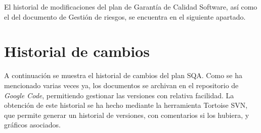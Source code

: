 \documentclass[spanish,a4paper,11pt, twoside]{report}	%
\begin{document}
	El historial de modificaciones del plan de Garantía de Calidad Software, así como el del documento de Gestión de riesgos, se encuentra en el siguiente apartado.

	\section{Historial de cambios}
	
	A continuación se muestra el historial de cambios del plan SQA. Como se ha mencionado varias veces ya, los documentos se archivan en el repositorio de \textit{Google Code}, permitiendo gestionar las versiones con relativa facilidad. La obtención de este historial se ha hecho mediante la herramienta Tortoise SVN, que permite generar un historial de versiones, con comentarios si los hubiera, y gráficos asociados.


\newpage
\mbox{}
\thispagestyle{empty}						%
\newpage
\end{document}
